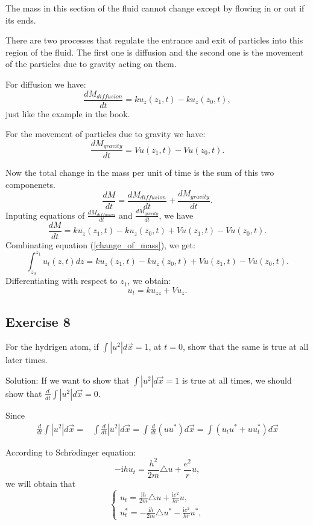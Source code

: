 \documentclass{article}
\begin{document}
			The mass in this section of the fluid cannot change
			except by flowing in or out if its ends.

			There are two processes that regulate the entrance and
			exit of particles into this region of the fluid.
			The first one is diffusion and the second one is the
			movement of the particles due to gravity acting on
			them.

			For diffusion we have:
			\[\frac{dM_{diffusion}}{dt}=ku_z(z_1,t)-ku_z(z_0,t),\]
			just like the example in the book.

			For the movement of particles due to gravity we have:
			\[\frac{dM_{gravity}}{dt} = Vu(z_1,t) - Vu(z_0,t).\]

			Now the total change in the mass per unit of time is
			the sum of this two componenets.
			\[\frac{dM}{dt}=\frac{dM_{diffusion}}{dt}+\frac{dM_{gravity}}{dt}.\]
			Inputing equations of $\frac{dM_{diffusion}}{dt} $ and $\frac{dM_{gravity}}{dt} $, we have
            \[\frac{dM}{dt}=ku_z(z_1,t)-ku_z(z_0,t) + Vu(z_1,t) - Vu(z_0,t). \]			
			Combinating equation (\ref{change_of_mass}), we get:
			\[\int_{z_0}^{z_1}u_t(z,t)dz= ku_z(z_1,t)-ku_z(z_0,t) + Vu(z_1,t) - Vu(z_0,t).\]
			Differentiating with respect to $z_1$, we obtain:
			\[
				u_t=ku_{zz}+Vu_z.
			\]

		\subsection{Exercise 8}
	For the hydrigen atom, if $ \int \left | u^2 \right | d \vec{x } =1$, at $t=0$, show that the same is true at all later times.
		
		Solution: If we want to show that $ \int \left | u^2 \right | d \vec{x } =1$ is true at all times, we should show that $\frac{d}{dt}\int \left | u^2 \right | d \vec{x } =0$.
                  
		Since
		\begin{align*}
			 \frac{d}{dt}\int \left | u^2 \right | d \vec{x } =&
			 \int \frac{d}{dt} \left | u^2 \right | d \vec{x }=
			 \int \frac{d}{dt} \left(uu^* \right)d \vec{x }=
			 \int\left(  u_{t}u^*+uu_{t}^*\right) d \vec{x }
		\end{align*}

		According to Schr$\ddot{o}$dinger equation: 
		\[-\mathrm{i}hu_{t}=\frac{h^2}{2m}\triangle u+ \frac{e^2}{r}u,\]
		we will obtain that
		\begin{equation*}
			\begin{cases}
				u_{t}=\frac{\mathrm{i}h}{2m}\triangle u+ \frac{\mathrm{i}e^2}{hr}u,
				\\
				u_{t}^*=-\frac{\mathrm{i}h}{2m}\triangle u^*-\frac{\mathrm{i}e^2}{hr}u^*,
			\end{cases}
		\end{equation*}
		
\end{document}
